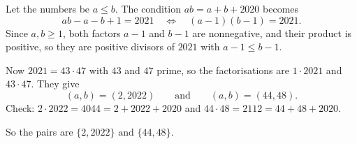 Let the numbers be $a\le b$. The condition $ab=a+b+2020$ becomes
\[ab-a-b+1=2021\quad\Longleftrightarrow\quad (a-1)(b-1)=2021.\]
Since $a,b\ge1$, both factors $a-1$ and $b-1$ are nonnegative, and their product is positive, so they are positive divisors of $2021$ with $a-1\le b-1$.

Now $2021=43\cdot47$ with $43$ and $47$ prime, so the factorisations are $1\cdot2021$ and $43\cdot47$. They give
\[(a,b)=(2,2022)\qquad\text{and}\qquad(a,b)=(44,48).\]
Check: $2\cdot2022=4044=2+2022+2020$ and $44\cdot48=2112=44+48+2020$.

So the pairs are $\boxed{\{2,2022\}\text{ and }\{44,48\}}$.
